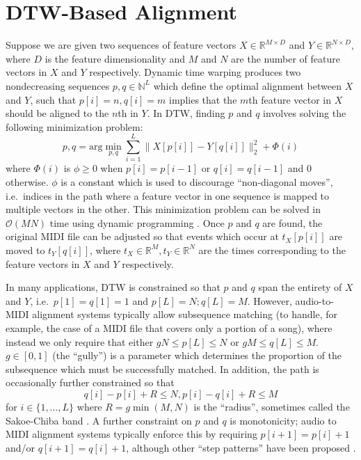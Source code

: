 \documentclass{article}
\begin{document}
\section{DTW-Based Alignment}
\label{sec:dtw}

Suppose we are given two sequences of feature vectors $X \in \mathbb{R}^{M \times D}$ and $Y \in \mathbb{R}^{N \times D}$, where $D$ is the feature dimensionality and $M$ and $N$ are the number of feature vectors in $X$ and $Y$ respectively.
Dynamic time warping produces two nondecreasing sequences $p, q \in \mathbb{N}^L$ which define the optimal alignment between $X$ and $Y$, such that $p[i] = n, q[i] = m$ implies that the $m$th feature vector in $X$ should be aligned to the $n$th in $Y$.
In DTW, finding $p$ and $q$ involves solving the following minimization problem:
$$
p, q = \mathrm{arg}\min_{p, q} \sum_{i = 1}^{L} \|X[p[i]] - Y[q[i]]\|_2^2 + \Phi(i)
$$
where $\Phi(i)$ is $\phi \ge 0$ when $p[i] = p[i - 1]$ or $q[i] = q[i - 1]$ and $0$ otherwise.
$\phi$ is a constant which is used to discourage ``non-diagonal moves'', i.e.\ indices in the path where a feature vector in one sequence is mapped to multiple vectors in the other.
This minimization problem can be solved in $\mathcal{O}(MN)$ time using dynamic programming \cite{sakoe1978dynamic}.
Once $p$ and $q$ are found, the original MIDI file can be adjusted so that events which occur at $t_X[p[i]]$ are moved to $t_Y[q[i]]$, where $t_X \in \mathbb{R}^M, t_Y \in \mathbb{R}^N$ are the times corresponding to the feature vectors in $X$ and $Y$ respectively.

In many applications, DTW is constrained so that $p$ and $q$ span the entirety of $X$ and $Y$, i.e.\ $p[1] = q[1] = 1$ and $p[L] = N; q[L] = M$.
However, audio-to-MIDI alignment systems typically allow subsequence matching (to handle, for example, the case of a MIDI file that covers only a portion of a song), where instead we only require that either $gN \le p[L] \le N$ or $gM \le q[L] \le M$.
$g \in [0, 1]$ (the ``gully'') is a parameter which determines the proportion of the subsequence which must be successfully matched.
In addition, the path is occasionally further constrained so that
$$
q[i] - p[i] + R \le N, p[i] - q[i] + R \le M
$$
for $i \in \{1, \ldots, L\}$ where $R = g\min(M, N)$ is the ``radius'', sometimes called the Sakoe-Chiba band \cite{sakoe1978dynamic}.
A further constraint on $p$ and $q$ is monotonicity; audio to MIDI alignment systems typically enforce this by requiring $p[i + 1] = p[i] + 1$ and/or $q[i + 1] = q[i] + 1$, although other ``step patterns'' have been proposed \cite{muller2007dynamic, sakoe1978dynamic}.
\end{document}

